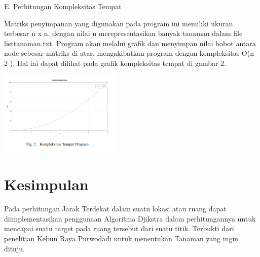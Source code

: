 \documentclass[conference]{IEEEtran}
\begin{document}
E. Perhitungan Kompleksitas Tempat\vspace{0.5cm}

Matriks penyimpanan yang digunakan pada program ini
memiliki ukuran terbesar n x n, dengan nilai n merepresentasikan banyak tanaman dalam file listtanaman.txt. Program
akan melalui grafik dan menyimpan nilai bobot antara node
sebesar matriks di atas, mengakibatkan program dengan kompleksitas O(n
2
). Hal ini dapat dilihat pada grafik kompleksitas 
tempat di gambar 2.\vspace{0.5cm}

\includegraphics[scale=0.75]{tugas0530.jpg}\vspace{0.5cm}
\section{Kesimpulan}
Pada perhitungan Jarak Terdekat dalam suatu lokasi atau ruang dapat diimplementasikan penggunaan Algoritma Djikstra
dalam perhitungannya untuk mencapai suatu target pada ruang
tersebut dari suatu titik. Terbukti dari penelitian Kebun Raya
Purwodadi untuk menentukan Tanaman yang ingin dituju.
\begin{refsection}

\printbibliography[heading=subbibliography]
\end{refsection}
\end{document}
